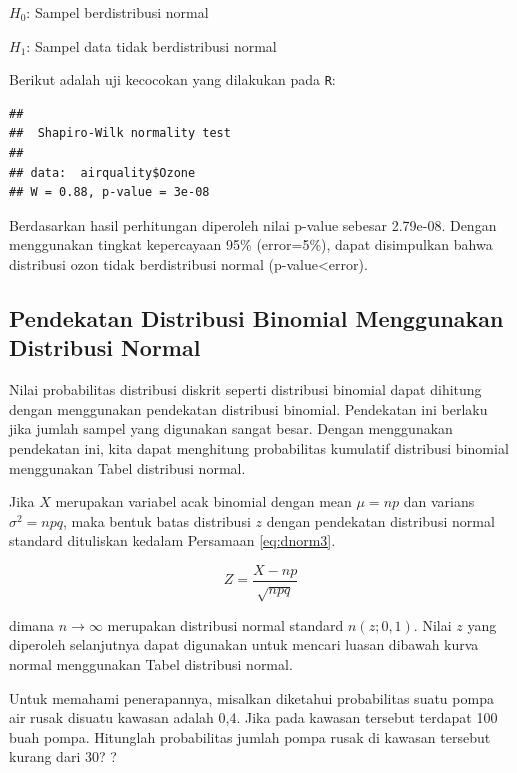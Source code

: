 \documentclass[]{book}
\newenvironment{Shaded}{\begin{snugshade}}{\end{snugshade}}
\newcommand{\KeywordTok}[1]{\textcolor[rgb]{0.13,0.29,0.53}{\textbf{#1}}}
\newcommand{\OperatorTok}[1]{\textcolor[rgb]{0.81,0.36,0.00}{\textbf{#1}}}
\newcommand{\NormalTok}[1]{#1}
\begin{document}
\(H_0\): Sampel berdistribusi normal

\(H_1\): Sampel data tidak berdistribusi normal

Berikut adalah uji kecocokan yang dilakukan pada \texttt{R}:

\begin{Shaded}
\end{Shaded}

\begin{verbatim}
## 
##  Shapiro-Wilk normality test
## 
## data:  airquality$Ozone
## W = 0.88, p-value = 3e-08
\end{verbatim}

Berdasarkan hasil perhitungan diperoleh nilai p-value sebesar 2.79e-08.
Dengan menggunakan tingkat kepercayaan 95\% (error=5\%), dapat
disimpulkan bahwa distribusi ozon tidak berdistribusi normal
(p-value\textless{}error).

\subsection{Pendekatan Distribusi Binomial Menggunakan Distribusi
Normal}\label{pendekatan-distribusi-binomial-menggunakan-distribusi-normal}

Nilai probabilitas distribusi diskrit seperti distribusi binomial dapat
dihitung dengan menggunakan pendekatan distribusi binomial. Pendekatan
ini berlaku jika jumlah sampel yang digunakan sangat besar. Dengan
menggunakan pendekatan ini, kita dapat menghitung probabilitas kumulatif
distribusi binomial menggunakan Tabel distribusi normal.

Jika \(X\) merupakan variabel acak binomial dengan mean \(\mu=np\) dan
varians \(\sigma^2=npq\), maka bentuk batas distribusi \(z\) dengan
pendekatan distribusi normal standard dituliskan kedalam Persamaan
\eqref{eq:dnorm3}.

\begin{equation}
   Z=\frac{X-np}{\sqrt{npq}}
  \label{eq:dnorm3}
\end{equation}

dimana \(n\to\infty\) merupakan distribusi normal standard
\(n\left(z;0,1\right)\). Nilai \(z\) yang diperoleh selanjutnya dapat
digunakan untuk mencari luasan dibawah kurva normal menggunakan Tabel
distribusi normal.

Untuk memahami penerapannya, misalkan diketahui probabilitas suatu pompa
air rusak disuatu kawasan adalah 0,4. Jika pada kawasan tersebut
terdapat 100 buah pompa. Hitunglah probabilitas jumlah pompa rusak di
kawasan tersebut kurang dari 30? ?
\end{document}
